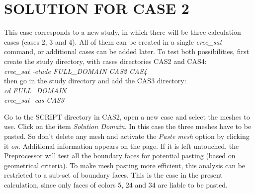%
%
%
%
%
%
%
\section{SOLUTION FOR CASE 2}
This case corresponds to a new study, in which there will be three calculation
cases (cases 2, 3 and 4). All of them can be created in a single {\itshape
cree\_sat} command, or additional cases can be added later. To test both
possibilities, first create the study directory, with cases directories CAS2
and CAS4:\\
{\itshape cree\_sat -etude FULL\_DOMAIN CAS2 CAS4}\\
then go in the study directory and add the CAS3 directory:\\
{\itshape cd FULL\_DOMAIN}\\
{\itshape cree\_sat -cas CAS3}

Go to the SCRIPT directory in CAS2,
open a new case and select the meshes to use. Click on the
item {\itshape Solution Domain}. In this case the three meshes have to be
pasted. So don't delete any mesh and activate the {\itshape Paste mesh} option by
clicking it {\itshape on}. Additional information appears on the page. If it is
left untouched, the \CS Preprocessor will test all the boundary faces for
potential pasting (based on geometrical criteria). To make mesh pasting more
efficient, this analysis can be restricted to a sub-set of boundary faces. This
is the case in the present calculation, since only faces of colors 5, 24 and 34
are liable to be pasted.

